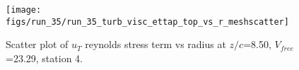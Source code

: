 \begin{figure}[H]
\centering
\texttt{[image: figs/run\_35/run\_35\_turb\_visc\_ettap\_top\_vs\_r\_meshscatter]}
\caption{Scatter plot of $
u_T$ reynolds stress term vs radius at $z/c$=8.50, $V_{free}$=23.29, station 4.}
\label{fig:run_35_turb_visc_ettap_top_vs_r_meshscatter}
\end{figure}


